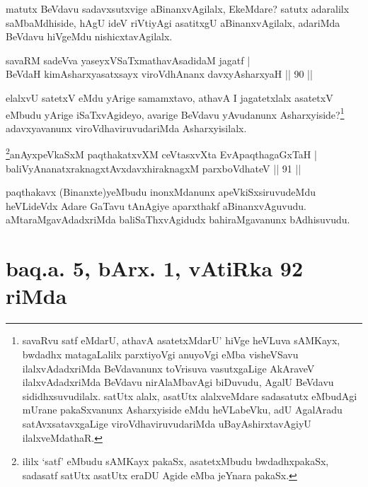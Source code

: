 \begin{artha}
matutx BeVdavu sadavxsutxvige aBinanxvAgilalx, EkeMdare? satutx adaralilx saMbaMdhiside, hAgU ideV riVtiyAgi asatitxgU aBinanxvAgilalx, adariMda BeVdavu hiVgeMdu nishicxtavAgilalx.
\end{artha}



\begin{shl}
savaRM sadeVva yaseyxVSaTxmathavA\s  sadidaM jagatf  | \\
BeVdaH kimAsharxyasatxsayx viroVdhAnanx davxyAsharxyaH \hfill||  90 ||  
\end{shl}

\begin{artha}
elalxvU satetxV eMdu yArige samamxtavo, athavA I jagatetxlalx asatetxV eMbudu yArige iSaTxvAgideyo, avarige BeVdavu yAvudanunx Asharxyiside?\footnote{savaRvu satf eMdarU, athavA asatetxMdarU' hiVge heVLuva sAMKayx, bwdadhx matagaLalilx parxtiyoVgi anuyoVgi eMba visheVSavu ilalxvAdadxriMda BeVdavanunx toVrisuva vasutxgaLige AkAraveV ilalxvAdadxriMda BeVdavu nirAlaMbavAgi biDuvudu, AgalU BeVdavu sididhxsuvudilalx. satUtx alalx, asatUtx alalxveMdare sadasatutx eMbudAgi mUrane pakaSxvanunx Asharxyiside eMdu heVLabeVku, adU AgalAradu satAvxsatavxgaLige viroVdhaviruvudariMda uBayAshirxtavAgiyU ilalxveMdathaR.} adavxyavanunx viroVdhaviruvudariMda Asharxyisilalx.
\end{artha}


\begin{shl}
\footnote{ ililx `satf' eMbudu sAMKayx pakaSx, asatetxMbudu bwdadhxpakaSx, sadasatf satUtx asatUtx eraDU Agide eMba jeYnara pakaSx.}anAyxpeVkaSxM paqthakatxvXM ceVtasxvXta EvApaqthagaGxTaH  | \\
baliVyAnanatxraknagxtAvxdavxhiraknagxM parxboVdhateV \hfill||  91 ||  
\end{shl}

\begin{artha}
paqthakavx (Binanxte)yeMbudu inonxMdanunx apeVkiSxsiruvudeMdu heVLideVdx Adare GaTavu tAnAgiye aparxthakf aBinanxvAguvudu. aMtaraMgavAdadxriMda baliSaThxvAgidudx bahiraMgavanunx bAdhisuvudu.
\end{artha}


\section*{baq.a. 5, bArx. 1, vAtiRka 92 riMda}

